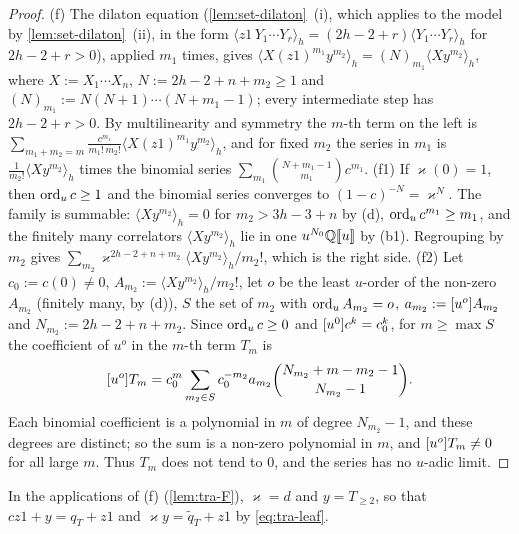 \begin{proof}
(f) The dilaton equation (\cref{lem:set-dilaton}~(i), which applies to the model by \cref{lem:set-dilaton}~(ii), in the form $\langle z1\,Y_1\cdots Y_r\rangle_h = (2h-2+r)\langle Y_1\cdots Y_r\rangle_h$ for $2h-2+r>0$), applied $m_1$ times, gives $\langle X(z1)^{m_1}y^{m_2}\rangle_h = (N)_{m_1}\langle Xy^{m_2}\rangle_h$, where $X := X_1\cdots X_n$, $N := 2h-2+n+m_2\geq 1$ and $(N)_{m_1} := N(N+1)\cdots(N+m_1-1)$; every intermediate step has $2h-2+r>0$. By multilinearity and symmetry the $m$-th term on the left is $\sum_{m_1+m_2 = m}\frac{c^{m_1}}{m_1!\,m_2!}\langle X(z1)^{m_1}y^{m_2}\rangle_h$, and for fixed $m_2$ the series in $m_1$ is $\frac{1}{m_2!}\langle Xy^{m_2}\rangle_h$ times the binomial series $\sum_{m_1}\binom{N+m_1-1}{m_1}c^{m_1}$. (f1) If $\varkappa(0) = 1$, then $\operatorname{ord}_uc\geq 1$ and the binomial series converges to $(1-c)^{-N} = \varkappa^N$. The family is summable: $\langle Xy^{m_2}\rangle_h = 0$ for $m_2>3h-3+n$ by (d), $\operatorname{ord}_uc^{m_1}\geq m_1$, and the finitely many correlators $\langle Xy^{m_2}\rangle_h$ lie in one $u^{N_0}\mathbb{Q}[\![ u ]\!]$ by (b1). Regrouping by $m_2$ gives $\sum_{m_2}\varkappa^{2h-2+n+m_2}\langle Xy^{m_2}\rangle_h/m_2!$, which is the right side. (f2) Let $c_0 := c(0)\neq 0$, $A_{m_2} := \langle Xy^{m_2}\rangle_h/m_2!$, let $o$ be the least $u$-order of the non-zero $A_{m_2}$ (finitely many, by (d)), $S$ the set of $m_2$ with $\operatorname{ord}_uA_{m_2} = o$, $a_{m_2} := [u^o]A_{m_2}$ and $N_{m_2} := 2h-2+n+m_2$. Since $\operatorname{ord}_uc\geq 0$ and $[u^0]c^k = c_0^k$, for $m\geq\max S$ the coefficient of $u^o$ in the $m$-th term $T_m$ is
\[
[u^o]T_m = c_0^m\sum_{m_2\in S}c_0^{-m_2}a_{m_2}\binom{N_{m_2}+m-m_2-1}{N_{m_2}-1}.
\]
Each binomial coefficient is a polynomial in $m$ of degree $N_{m_2}-1$, and these degrees are distinct; so the sum is a non-zero polynomial in $m$, and $[u^o]T_m\neq 0$ for all large $m$. Thus $T_m$ does not tend to $0$, and the series has no $u$-adic limit.
\end{proof}

In the applications of (f) (\cref{lem:tra-F}), $\varkappa = d$ and $y = T_{\geq 2}$, so that $cz1+y = q_T+z1$ and $\varkappa y = \tilde q_T+z1$ by \eqref{eq:tra-leaf}.

